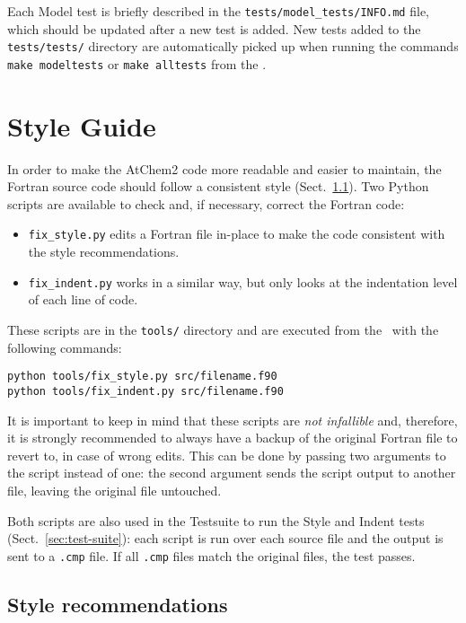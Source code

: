 Each Model test is briefly described in the \texttt{tests/model\_tests/INFO.md}
file, which should be updated after a new test is added. New tests added
to the \texttt{tests/tests/} directory are automatically picked up when
running the commands \verb|make modeltests| or \verb|make alltests| from
the \maindir.

\section{Style Guide} \label{sec:style-guide}

In order to make the AtChem2 code more readable and easier to
maintain, the Fortran source code should follow a consistent style
(Sect.~\ref{subsec:style-recommendations}). Two Python scripts are
available to check and, if necessary, correct the Fortran code:

\begin{itemize}
\item \texttt{fix\_style.py} edits a Fortran file in-place to make the
  code consistent with the style recommendations.
\item \texttt{fix\_indent.py} works in a similar way, but only looks
  at the indentation level of each line of code.
\end{itemize}

These scripts are in the \texttt{tools/} directory and are executed
from the \maindir\ with the following commands:

\begin{verbatim}
python tools/fix_style.py src/filename.f90
python tools/fix_indent.py src/filename.f90
\end{verbatim}

It is important to keep in mind that these scripts are \emph{not infallible}
and, therefore, it is strongly recommended to always have a backup of the
original Fortran file to revert to, in case of wrong edits. This can be
done by passing two arguments to the script instead of one: the second
argument sends the script output to another file, leaving the original
file untouched.

Both scripts are also used in the Testsuite to run the Style and
Indent tests (Sect.~\ref{sec:test-suite}): each script is run over
each source file and the output is sent to a \texttt{.cmp} file. If
all \texttt{.cmp} files match the original files, the test passes.

\subsection{Style recommendations} \label{subsec:style-recommendations}

